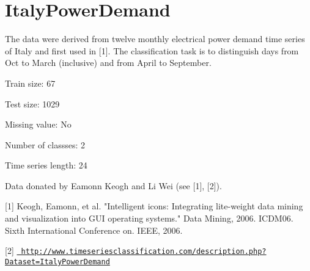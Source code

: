 \chapter{Italy\+Power\+Demand}
\hypertarget{md_external_2data_2UCRArchive__2018_2ItalyPowerDemand_2README}{}\label{md_external_2data_2UCRArchive__2018_2ItalyPowerDemand_2README}
\label{md_external_2data_2UCRArchive__2018_2ItalyPowerDemand_2README_autotoc_md132}%
%
 The data were derived from twelve monthly electrical power demand time series of Italy and first used in \mbox{[}1\mbox{]}. The classification task is to distinguish days from Oct to March (inclusive) and from April to September.

Train size\+: 67

Test size\+: 1029

Missing value\+: No

Number of classses\+: 2

Time series length\+: 24

Data donated by Eamonn Keogh and Li Wei (see \mbox{[}1\mbox{]}, \mbox{[}2\mbox{]}).

\mbox{[}1\mbox{]} Keogh, Eamonn, et al. "{}\+Intelligent icons\+: Integrating lite-\/weight data mining and visualization into GUI operating systems."{} Data Mining, 2006. ICDM\textquotesingle{}06. Sixth International Conference on. IEEE, 2006.

\mbox{[}2\mbox{]} \href{http://www.timeseriesclassification.com/description.php?Dataset=ItalyPowerDemand}{\texttt{ http\+://www.\+timeseriesclassification.\+com/description.\+php?\+Dataset=\+Italy\+Power\+Demand}} 